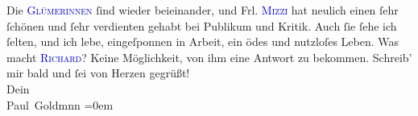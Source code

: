            \pstart
           Die \textsc{\textcolor{blue}{Glümerinnen}{}\ledrightnote{{$\rightarrow$}\textcolor{blue}{Marie Glümer}{\newline}{$\rightarrow$}\textcolor{blue}{Auguste Chlum}}} ſind wieder beieinander, und Frl. \textsc{\textcolor{blue}{Mizzi}{}\ledrightnote{\textcolor{blue}{Marie Glümer}}} hat neulich {\pb}einen ſehr  ſchönen und ſehr verdienten \label{K_L02936-20v}\label{K_L02936-20h} gehabt bei Publikum und Kritik. Auch ſie ſehe ich ſelten,
               und ich lebe, eingeſponnen in Arbeit, ein ödes und nutzloſes Leben.\pend
           \pstart
           Was macht \textsc{\textcolor{blue}{Richard}{}\ledrightnote{\textcolor{blue}{Richard Beer-Hofmann}}}? Keine Möglichkeit, von ihm eine Antwort zu bekommen.\pend
           \pstart
           Schreib’ mir bald und  ſei von Herzen
               gegrüßt!{\\[\baselineskip]} Dein {\\[\baselineskip]}\spacefill\mbox{Paul Goldmnn}\pend
           \leftskip=0em{}\endnumbering{}  
      
